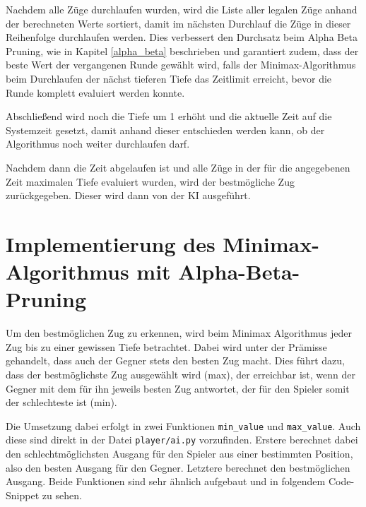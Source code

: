 Nachdem alle Züge durchlaufen wurden, wird die Liste aller legalen Züge
anhand der berechneten Werte sortiert, damit im nächsten Durchlauf die
Züge in dieser Reihenfolge durchlaufen werden. Dies verbessert den
Durchsatz beim Alpha Beta Pruning, wie in Kapitel \ref{alpha_beta} beschrieben und
garantiert zudem, dass der beste Wert der vergangenen Runde gewählt
wird, falls der Minimax-Algorithmus beim Durchlaufen der nächst tieferen
Tiefe das Zeitlimit erreicht, bevor die Runde komplett evaluiert werden
konnte.

Abschließend wird noch die Tiefe um 1 erhöht und die aktuelle Zeit auf
die Systemzeit gesetzt, damit anhand dieser entschieden werden kann, ob
der Algorithmus noch weiter durchlaufen darf.

Nachdem dann die Zeit abgelaufen ist und alle Züge in der für die
angegebenen Zeit maximalen Tiefe evaluiert wurden, wird der bestmögliche Zug zurückgegeben. Dieser wird dann von der KI ausgeführt.

    \section{Implementierung des Minimax-Algorithmus mit
Alpha-Beta-Pruning}\label{implementierung-des-minimax-algorithmus-mit-alpha-beta-pruning}

Um den bestmöglichen Zug zu erkennen, wird beim Minimax Algorithmus
jeder Zug bis zu einer gewissen Tiefe betrachtet. Dabei wird unter der
Prämisse gehandelt, dass auch der Gegner stets den besten Zug macht.
Dies führt dazu, dass der bestmöglichste Zug ausgewählt wird (max), der
erreichbar ist, wenn der Gegner mit dem für ihn jeweils besten Zug
antwortet, der für den Spieler somit der schlechteste ist (min).

Die Umsetzung dabei erfolgt in zwei Funktionen \texttt{min\_value} und
\texttt{max\_value}. Auch diese sind direkt in der Datei
\texttt{player/ai.py} vorzufinden. Erstere berechnet dabei den schlechtmöglichsten Ausgang für den Spieler aus einer bestimmten Position, also
den besten Ausgang für den Gegner. Letztere berechnet den bestmöglichen Ausgang. Beide Funktionen sind sehr ähnlich aufgebaut und in
folgendem Code-Snippet zu sehen.

